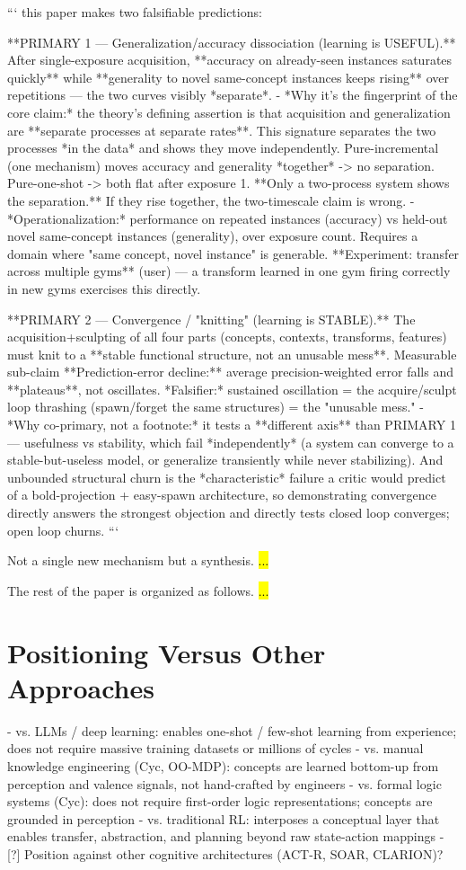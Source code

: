 \documentclass{article}
\begin{document}
```
this paper makes two falsifiable predictions:

**PRIMARY 1 — Generalization/accuracy dissociation (learning is USEFUL).** After single-exposure acquisition, **accuracy on already-seen instances saturates quickly** while **generality to novel same-concept instances keeps rising** over repetitions — the two curves visibly *separate*.
- *Why it's the fingerprint of the core claim:* the theory's defining assertion is that acquisition and generalization are **separate processes at separate rates**. This signature separates the two processes *in the data* and shows they move independently. Pure-incremental (one mechanism) moves accuracy and generality *together* -> no separation. Pure-one-shot -> both flat after exposure 1. **Only a two-process system shows the separation.** If they rise together, the two-timescale claim is wrong.
- *Operationalization:* performance on repeated instances (accuracy) vs held-out novel same-concept instances (generality), over exposure count. Requires a domain where "same concept, novel instance" is generable. **Experiment: transfer across multiple gyms** (user) — a transform learned in one gym firing correctly in new gyms exercises this directly.

**PRIMARY 2 — Convergence / "knitting" (learning is STABLE).** The acquisition+sculpting of all four parts (concepts, contexts, transforms, features) must knit to a **stable functional structure, not an unusable mess**. Measurable sub-claim
**Prediction-error decline:** average precision-weighted error falls and **plateaus**, not oscillates. *Falsifier:* sustained oscillation = the acquire/sculpt loop thrashing (spawn/forget the same structures) = the "unusable mess."
- *Why co-primary, not a footnote:* it tests a **different axis** than PRIMARY 1 — usefulness vs stability, which fail *independently* (a system can converge to a stable-but-useless model, or generalize transiently while never stabilizing). And unbounded structural churn is the *characteristic* failure a critic would predict of a bold-projection + easy-spawn architecture, so demonstrating convergence directly answers the strongest objection and directly tests closed loop converges; open loop churns.
```

Not a single new mechanism but a synthesis. \hl{...}

The rest of the paper is organized as follows. \hl{...}

\section{Positioning Versus Other Approaches}
- vs. LLMs / deep learning: enables one-shot / few-shot learning from experience; does not require massive training datasets or millions of cycles
- vs. manual knowledge engineering (Cyc, OO-MDP): concepts are learned bottom-up from perception and valence signals, not hand-crafted by engineers
- vs. formal logic systems (Cyc): does not require first-order logic representations; concepts are grounded in perception
- vs. traditional RL: interposes a conceptual layer that enables transfer, abstraction, and planning beyond raw state-action mappings
- [?] Position against other cognitive architectures (ACT-R, SOAR, CLARION)?
\end{document}

